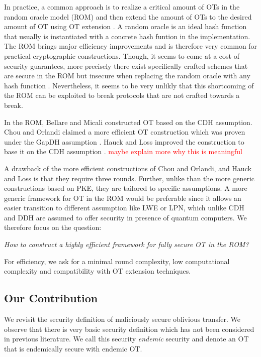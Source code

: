 In practice, a common approach is to realize a critical amount of OTs in the random oracle model (ROM) \cite{CCS:BelRog93} and then extend the amount of OTs to the desired amount of OT using OT extension \cite{STOC:Beaver96a,C:IKNP03,RSA:OrrOrsSch17}. A random oracle is an ideal hash function that usually is instantiated with a concrete hash funtion in the implementation. The ROM brings major efficiency improvements and is therefore very common for practical cryptographic constructions. Though, it seems to come at a cost of security guarantees, more precisely there exist specifically crafted schemes that are secure in the ROM but insecure when replacing the random oracle with any hash function \cite{STOC:CanGolHal98}. Nevertheless, it seems to be very unlikly that this shortcoming of the ROM can be exploited to break protocols that are not crafted towards a break. 

In the ROM, Bellare and Micali \cite{C:BelMic89} constructed OT based on the CDH assumption. Chou and Orlandi \cite{LC:ChoOrl15} claimed a more efficient OT construction which was proven under the GapDH assumption \cite{cryptoeprint:2017:1011}. Hauck and Loss improved the construction to base it on the CDH assumption \cite{cryptoeprint:2017:1011}. \textcolor{red}{maybe explain more why this is meaningful}

A drawback of the more efficient constructions of Chou and Orlandi, and Hauck and Loss is that they require three rounds. Further, unlike than the more generic constructions based on PKE, they are tailored to specific assumptions. A more generic framework for OT in the ROM would be preferable since it allows an easier transition to different assumption like LWE or LPN, which unlike CDH and DDH are assumed to offer security in presence of quantum computers. We therefore focus on the question:

\begin{center}
\emph{How to construct a highly efficient framework for fully secure OT in the ROM?}
\end{center}

For efficiency, we ask for a minimal round complexity, low computational complexity and compatibility with OT extension techniques.

\subsection{Our Contribution}

We revisit the security definition of maliciously secure oblivious transfer. We observe that there is very basic security definition which has not been considered in previous literature. We call this security \emph{endemic} security and denote an OT that is endemically secure with endemic OT. 


